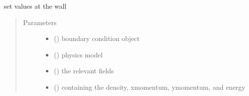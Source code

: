 \documentclass[letterpaper,10pt,english]{sphinxmanual}
\begin{document}
\begin{fulllineitems}
\label{\detokenize{autoapi/bcwall/index:bcwall.wall}}
\sphinxAtStartPar
set values at the wall
\begin{quote}\begin{description}
\item[{Parameters}] \leavevmode\begin{itemize}
\item {} 
\sphinxAtStartPar
{} () \textendash{} boundary condition object

\item {} 
\sphinxAtStartPar
{} ({\hyperref[\detokenize{autoapi/NavierStokes/index:NavierStokes.NavierStokes}]{}}) \textendash{} physics model

\item {} 
\sphinxAtStartPar
{} ({\hyperref[\detokenize{autoapi/Workspace/index:Workspace.Workspace}]{}}) \textendash{} the relevant fields

\item {} 
\sphinxAtStartPar
{} ({\hyperref[\detokenize{autoapi/Field/index:Field.Field}]{}}) \textendash{} containing the density, x\sphinxhyphen{}momentum, y\sphinxhyphen{}momentum, and energy

\end{itemize}

\end{description}\end{quote}

\end{fulllineitems}



\section{}
\label{\detokenize{autoapi/bc_metric/index:module-bc_metric}}\label{\detokenize{autoapi/bc_metric/index:bc-metric}}\label{\detokenize{autoapi/bc_metric/index::doc}}
\end{document}
